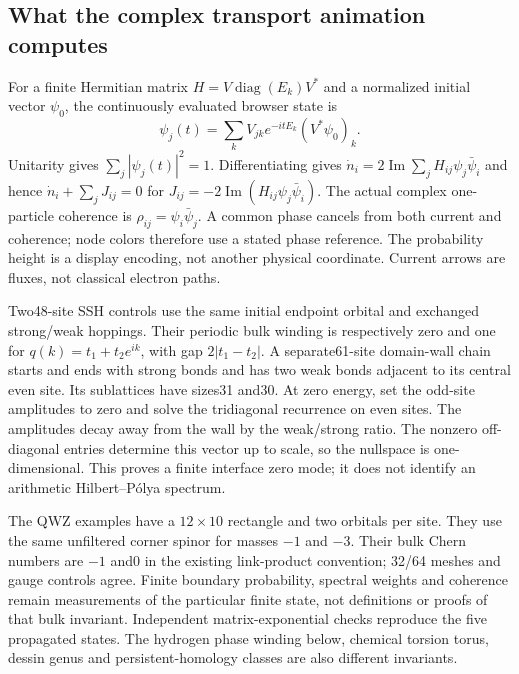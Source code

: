 \documentclass[11pt]{article}
\theoremstyle{definition}\newtheorem{definition}[theorem]{Definition}
\theoremstyle{remark}\newtheorem{remark}[theorem]{Remark}
\begin{document}
\subsection{What the complex transport animation computes}
For a finite Hermitian matrix $H=V\operatorname{diag}(E_k)V^*$ and a normalized
initial vector $\psi_0$, the continuously evaluated browser state is
\[
 \psi_j(t)=\sum_k V_{jk}e^{-itE_k}(V^*\psi_0)_k.
\]
Unitarity gives $\sum_j|\psi_j(t)|^2=1$. Differentiating gives
$\dot n_i=2\operatorname{Im}\sum_jH_{ij}\psi_j\bar\psi_i$ and hence
$\dot n_i+\sum_jJ_{ij}=0$ for
$J_{ij}=-2\operatorname{Im}(H_{ij}\psi_j\bar\psi_i)$.
The actual complex one-particle coherence is
$\rho_{ij}=\psi_i\bar\psi_j$. A common phase cancels from both current and
coherence; node colors therefore use a stated phase reference. The probability
height is a display encoding, not another physical coordinate. Current arrows
are fluxes, not classical electron paths.

Two48-site SSH controls use the same initial endpoint orbital and exchanged
strong/weak hoppings. Their periodic bulk winding is respectively zero and
one for $q(k)=t_1+t_2e^{ik}$, with gap $2|t_1-t_2|$. A separate61-site domain-wall chain starts and ends
with strong bonds and has two weak bonds adjacent to its central even site.
Its sublattices have sizes31 and30. At zero energy, set the odd-site amplitudes
to zero and solve the tridiagonal recurrence on even sites. The amplitudes
decay away from the wall by the weak/strong ratio. The nonzero off-diagonal
entries determine this vector up to scale, so the nullspace is one-dimensional.
This proves a finite interface zero mode; it does not identify an arithmetic
Hilbert--P\'olya spectrum.

The QWZ examples have a $12\times10$ rectangle and two orbitals per site.
They use the same unfiltered corner spinor for masses $-1$ and $-3$.
Their bulk Chern numbers are $-1$ and0 in the existing link-product convention;
32/64 meshes and gauge controls agree. Finite boundary probability, spectral
weights and coherence remain measurements of the particular finite state,
not definitions or proofs of that bulk invariant. Independent matrix-exponential
checks reproduce the five propagated states. The hydrogen phase winding below,
chemical torsion torus, dessin genus and persistent-homology classes are also
different invariants.
\end{document}

